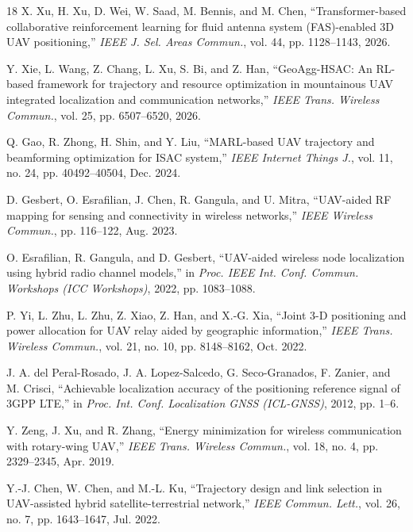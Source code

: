 \documentclass[10pt,journal,letterpaper]{IEEEtran}
\begin{document}
\begin{thebibliography}{18}
X. Xu, H. Xu, D. Wei, W. Saad, M. Bennis, and M. Chen, ``Transformer-based collaborative reinforcement learning for fluid antenna system (FAS)-enabled 3D UAV positioning,'' \emph{IEEE J. Sel. Areas Commun.}, vol. 44, pp. 1128--1143, 2026.

Y. Xie, L. Wang, Z. Chang, L. Xu, S. Bi, and Z. Han, ``GeoAgg-HSAC: An RL-based framework for trajectory and resource optimization in mountainous UAV integrated localization and communication networks,'' \emph{IEEE Trans. Wireless Commun.}, vol. 25, pp. 6507--6520, 2026.

Q. Gao, R. Zhong, H. Shin, and Y. Liu, ``MARL-based UAV trajectory and beamforming optimization for ISAC system,'' \emph{IEEE Internet Things J.}, vol. 11, no. 24, pp. 40492--40504, Dec. 2024.

D. Gesbert, O. Esrafilian, J. Chen, R. Gangula, and U. Mitra, ``UAV-aided RF mapping for sensing and connectivity in wireless networks,'' \emph{IEEE Wireless Commun.}, pp. 116--122, Aug. 2023.

O. Esrafilian, R. Gangula, and D. Gesbert, ``UAV-aided wireless node localization using hybrid radio channel models,'' in \emph{Proc. IEEE Int. Conf. Commun. Workshops (ICC Workshops)}, 2022, pp. 1083--1088.

P. Yi, L. Zhu, L. Zhu, Z. Xiao, Z. Han, and X.-G. Xia, ``Joint 3-D positioning and power allocation for UAV relay aided by geographic information,'' \emph{IEEE Trans. Wireless Commun.}, vol. 21, no. 10, pp. 8148--8162, Oct. 2022.

J. A. del Peral-Rosado, J. A. Lopez-Salcedo, G. Seco-Granados, F. Zanier, and M. Crisci, ``Achievable localization accuracy of the positioning reference signal of 3GPP LTE,'' in \emph{Proc. Int. Conf. Localization GNSS (ICL-GNSS)}, 2012, pp. 1--6.

Y. Zeng, J. Xu, and R. Zhang, ``Energy minimization for wireless communication with rotary-wing UAV,'' \emph{IEEE Trans. Wireless Commun.}, vol. 18, no. 4, pp. 2329--2345, Apr. 2019.

Y.-J. Chen, W. Chen, and M.-L. Ku, ``Trajectory design and link selection in UAV-assisted hybrid satellite-terrestrial network,'' \emph{IEEE Commun. Lett.}, vol. 26, no. 7, pp. 1643--1647, Jul. 2022.

\end{thebibliography}
\end{document}
